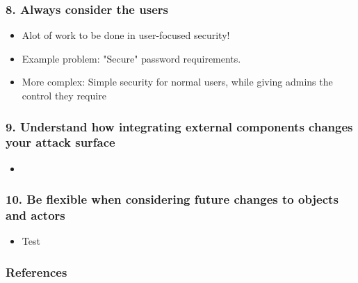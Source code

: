 \documentclass[12pt,norsk]{beamer}
\begin{document}
\begin{frame}

	\frametitle{8. Always consider the users}
	
	\begin{itemize}
	
	\item Alot of work to be done in user-focused security!
	\item Example problem: "Secure" password requirements.
	\item More complex: Simple security for normal users, while giving admins the control they require
	
	\end{itemize}

\end{frame}


\begin{frame}

	\frametitle{9. Understand how integrating external components changes your attack surface}
	
	\begin{itemize}
		\item 
	\end{itemize}
	

\end{frame}

\begin{frame}

	\frametitle{10. Be flexible when considering future changes to objects and actors}
	\begin{itemize}
		\item Test \cite{sample}
	\end{itemize}
	
	

\end{frame}

\begin{frame}

	\frametitle{References}
		
	
		

\end{frame}




\end{document}
